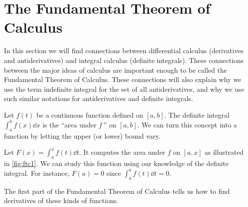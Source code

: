 \section{The Fundamental Theorem of Calculus}\label{sec:FTC}

In this section we will find connections between differential calculus (derivatives and antiderivatives) and integral calculus (definite integrals). These connections between the major ideas of calculus are important enough to be called the Fundamental Theorem of Calculus. These connections will also explain why we use the term indefinite integral for the set of all antiderivatives, and why we use such similar notations for antiderivatives and definite integrals.

Let $f(t)$ be a continuous function defined on $[a,b]$. The definite integral $\int_a^b f(x)\dd x$ is the ``area under $f\ $'' on $[a,b]$. We can turn this concept into a function by letting the upper (or lower) bound vary.

Let $F(x) = \int_a^x f(t)\dd t$. It computes the area under $f$ on $[a,x]$ as illustrated in \autoref{fig:ftc1}. We can study this function using our knowledge of the definite integral. For instance, $F(a)=0$ since $\int_a^af(t)\dd t=0$. %


The first part of the Fundamental Theorem of Calculus tells us how to find derivatives of these kinds of functions.


